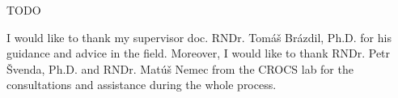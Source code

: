 
 {TODO}

 {I would like to thank my supervisor doc. RNDr. Tomáš Brázdil, Ph.D. for his guidance and advice in the field. Moreover, I would like to thank RNDr. Petr Švenda, Ph.D. and RNDr. Matúš Nemec from the CROCS lab for the consultations and assistance during the whole process.}
